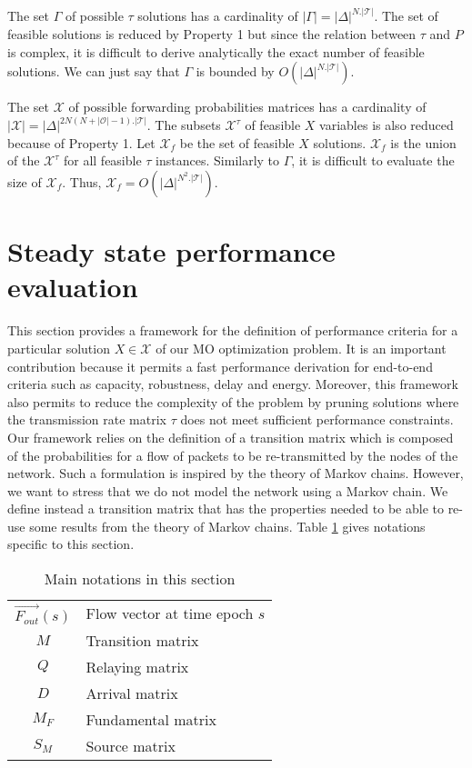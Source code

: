 \documentclass[a4paper]{article}
\newcommand{\T}{\mathcal{T}}
\newcommand{\X}{\mathcal{X}}
\newcommand{\Orig}{\mathcal{O}}
\newcommand{\Fout}[3]{\overrightarrow{ F_{#1}^{#2}}(#3)}
\newcommand{\Mmatrix}{M}
\newcommand{\Qmatrix}{Q}
\newcommand{\Rmatrix}{D}
\newcommand{\Nmatrix}{M_F}
\newcommand{\Smatrix}{S_M}
\begin{document}
The set $\Gamma$ of possible $\tau$ solutions has a cardinality of $|\Gamma|=|\Delta|^{N.|\T|}$. The set of feasible solutions is reduced by Property 1 but since the relation between $\tau$ and $P$ is complex, it is difficult to derive analytically the exact number of feasible solutions. We can just say that $\Gamma$ is bounded by $O(|\Delta|^{N.|\T|})$.

The set $\X$ of possible forwarding probabilities matrices has a cardinality of $|\X|=|\Delta|^{2N(N+|\Orig|-1).|\T|}$. The subsets $\X^\tau$ of feasible $X$ variables is also reduced because of Property 1. Let $\X_{f}$ be the set of feasible $X$ solutions. 
$\X_{f}$ is the union of the $\X^\tau$ for all feasible $\tau$ instances. 
Similarly to $\Gamma$, it is difficult to evaluate the size of $\X_f$. Thus, $\X_f = O(|\Delta|^{N^2.|\T|})$.




\section{Steady state performance evaluation}\label{sec:steadystate}

This section provides a framework for the definition of performance criteria for a particular solution $X \in \X$ of our MO optimization problem. 
It is an important contribution because it permits a fast performance derivation for end-to-end criteria such as capacity, robustness, delay and energy. Moreover, this framework also permits to reduce the complexity of the problem by pruning solutions where the transmission rate matrix $\tau$ does not meet sufficient performance constraints. 
Our framework relies on the definition of a transition matrix which is composed of the probabilities for a flow of packets to be re-transmitted by the nodes of the network. Such a formulation is inspired by the theory of Markov chains. However, we want to stress that we do not model the network using a Markov chain. We define instead a transition matrix that has the properties needed to be able to re-use some results from the theory of Markov chains.
Table \ref{tab:notations2} gives notations specific to this section. 

\begin{table} 
\caption{Main notations in this section} 
\centering
\label{tab:notations2}
\begin{tabular}{| c | l |}
\hline
$\Fout{out}{}{s}$	& Flow vector at time epoch $s$ \\
$\Mmatrix$		& Transition matrix \\
$\Qmatrix$		& Relaying matrix \\
$\Rmatrix$		& Arrival matrix \\
$\Nmatrix$		& Fundamental matrix \\
$\Smatrix$		& Source matrix \\
\hline

\end{tabular}
\end{table}
  
\end{document}
